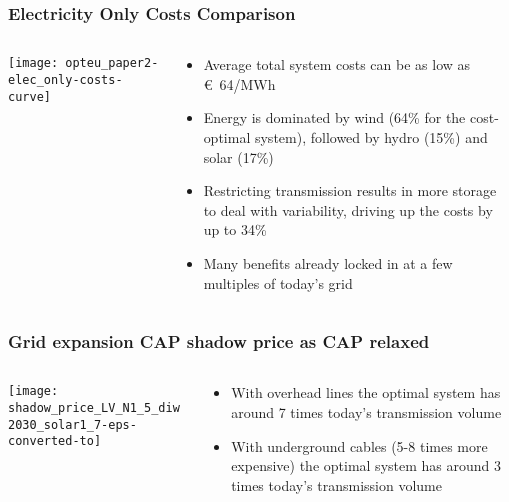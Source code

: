 \documentclass[10pt,aspectratio=169,dvipsnames]{beamer}
\let\olditem\item
\renewcommand{\item}{%
\olditem\vspace{5pt}}
\begin{document}
\begin{frame}
  \frametitle{Electricity Only Costs Comparison}

\begin{columns}[T]
  \begin{column}{9cm}

    \vspace{0.5cm}
  \texttt{[image: opteu\_paper2-elec\_only-costs-curve]}

  \end{column}

  \begin{column}{5cm}
    \begin{itemize}
    \item Average total system costs can be as low as \euro~64/MWh
     \item Energy is dominated by wind (64\% for the cost-optimal system), followed
       by hydro (15\%) and solar (17\%)
     \item Restricting transmission results in more storage to deal with variability, driving up the costs by up to 34\%
     \item Many benefits already locked in at a few multiples of today's grid
    \end{itemize}

  \end{column}

\end{columns}
\end{frame}


\begin{frame}
  \frametitle{Grid expansion CAP shadow price as CAP relaxed}


\begin{columns}[T]
\begin{column}{9cm}
\centering
  \texttt{[image: shadow\_price\_LV\_N1\_5\_diw2030\_solar1\_7-eps-converted-to]}
\end{column}
\begin{column}{4cm}
  \begin{itemize}
  \item With overhead lines the optimal system has around 7 times today's transmission volume
  \item With underground cables (5-8 times more expensive) the optimal system has around 3 times today's transmission volume
  \end{itemize}
\end{column}
\end{columns}

\end{frame}
\end{document}
